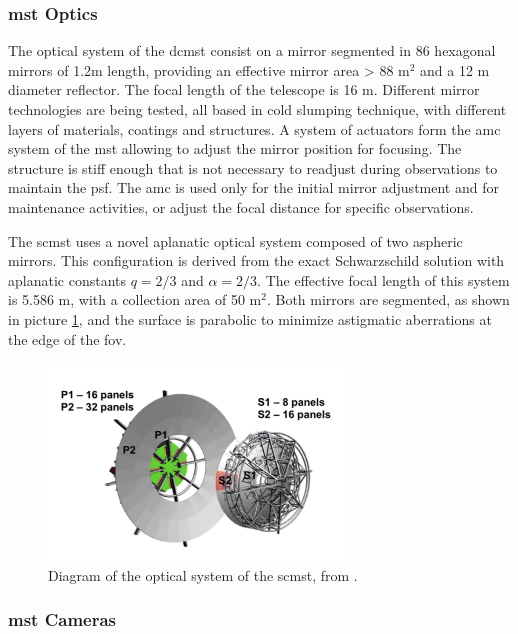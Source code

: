 \documentclass[main.tex]{subfiles}
\begin{document}
\subsubsection{\gls{mst} Optics}

The optical system of the \gls{dcmst} consist on a mirror segmented in 86 hexagonal mirrors of 1.2m length, providing an effective mirror area > 88 m$^2$ and a 12 m diameter reflector. The focal length of the telescope is 16 m.
Different mirror technologies are being tested, all based in cold slumping technique, with different layers of materials, coatings and structures. A system of actuators form the \gls{amc} system of the \gls{mst} allowing to adjust the mirror position for focusing. The structure is stiff enough that is not necessary to readjust during observations to maintain the \gls{psf}. The \gls{amc} is used only for the initial mirror adjustment and for maintenance activities, or adjust the focal distance for specific observations.

The \gls{scmst} uses a novel aplanatic optical system composed of two aspheric mirrors. This configuration is derived from the exact Schwarzschild solution with aplanatic constants $q=2/3$ and $\alpha = 2/3$. The effective focal length of this system is 5.586 m, with a collection area of 50 m$^2$. Both mirrors are segmented, as shown in picture \ref{fig:SCMSTmirrors}, and the surface is parabolic to minimize astigmatic aberrations at the edge of the \gls{fov}. 


\begin{figure}
\centering
 \includegraphics[width=0.7\textwidth]{Pictures/SCMSTMirrors.pdf}
  \caption{Diagram of the optical system of the \gls{scmst}, from \cite{2017SCMSTstatus}.}
    \label{fig:SCMSTmirrors}
\end{figure}

\subsubsection{\gls{mst} Cameras}
\end{document}
